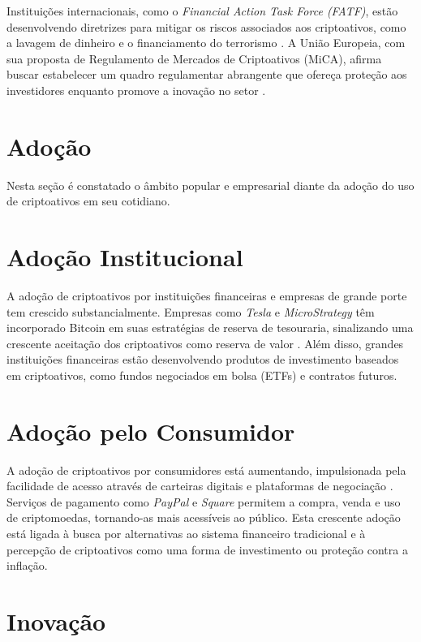 Instituições internacionais, como o \textit{Financial Action Task Force (FATF)}, estão desenvolvendo diretrizes para mitigar os riscos associados aos criptoativos, como a lavagem de dinheiro e o financiamento do terrorismo \cite{fatf2019guidance}. A União Europeia, com sua proposta de Regulamento de Mercados de Criptoativos (MiCA), afirma buscar estabelecer um quadro regulamentar abrangente que ofereça proteção aos investidores enquanto promove a inovação no setor \cite{european2020proposal}.

\section{Adoção}

Nesta seção é constatado o âmbito popular e empresarial diante da adoção do uso de criptoativos em seu cotidiano.

\section*{Adoção Institucional}

A adoção de criptoativos por instituições financeiras e empresas de grande porte tem crescido substancialmente. Empresas como \textit{Tesla} e \textit{MicroStrategy} têm incorporado Bitcoin em suas estratégias de reserva de tesouraria, sinalizando uma crescente aceitação dos criptoativos como reserva de valor \cite{bouri2017hedge}. Além disso, grandes instituições financeiras estão desenvolvendo produtos de investimento baseados em criptoativos, como fundos negociados em bolsa (ETFs) e contratos futuros.

\section*{Adoção pelo Consumidor}

A adoção de criptoativos por consumidores está aumentando, impulsionada pela facilidade de acesso através de carteiras digitais e plataformas de negociação \cite{kondor2014do}. Serviços de pagamento como \textit{PayPal} e \textit{Square} permitem a compra, venda e uso de criptomoedas, tornando-as mais acessíveis ao público. Esta crescente adoção está ligada à busca por alternativas ao sistema financeiro tradicional e à percepção de criptoativos como uma forma de investimento ou proteção contra a inflação.

\section{Inovação}
